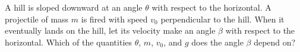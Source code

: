 A hill is sloped downward at an angle $\theta$ with respect to the horizontal. A projectile of mass $m$ is fired with speed $v_0$ perpendicular to the hill. When it eventually lands on the hill, let its velocity make an angle $\beta$ with respect to the horizontal. Which of the quantities $\theta$, $m$, $v_0$, and $g$ does the angle $\beta$ depend on?